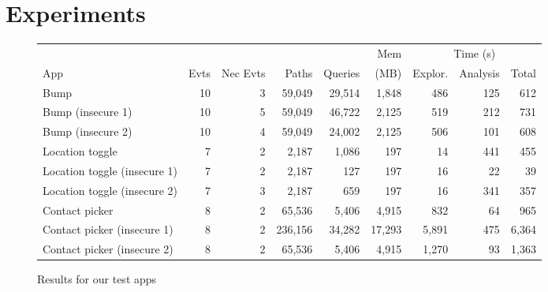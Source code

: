 \documentclass{entcs} \usepackage{entcsmacro}
\newcommand{\comment}[3][\color{red}]{{#1{[{#2}: {#3}]}}}
\newcommand{\kris}[1]{\comment[\color{orange}]{kris}{#1}}
\begin{document}

\section{Experiments}
\label{sec:experiments}

\begin{figure*}
\small
\centering
\begin{tabular}{ | l | r | r || r | r | r | r | r | r |}
  \hline
  &&&&& Mem &\multicolumn{3}{c|}{Time (s)} \\ \cline{6-8}
  App & Evts & Nec Evts & Paths & Queries &
  (MB) & Explor. & Analysis & Total \\
  \hline
  Bump & 10 & 3 & 59,049 & 29,514 & 1,848 & 486 & 125 & 612 \\
  Bump (insecure 1) & 10 & 5 & 59,049 & 46,722 & 2,125 & 519 & 212 & 731 \\
  Bump (insecure 2) & 10 & 4 & 59,049 & 24,002 & 2,125 & 506 & 101 & 608 \\
  Location toggle & 7 & 2 & 2,187 & 1,086 & 197 & 14 & 441 & 455 \\
  Location toggle (insecure 1) & 7 & 2  & 2,187 & 127 & 197 & 16 & 22 & 39 \\
  Location toggle (insecure 2) & 7 & 3 & 2,187 & 659 & 197 & 16 & 341 & 357 \\
  Contact picker & 8 & 2 & 65,536 & 5,406 & 4,915 & 832 & 64 & 965 \\
  Contact picker (insecure 1) & 8 & 2 & 236,156 & 34,282 & 17,293 & 5,891 & 475 & 6,364  \\
  Contact picker (insecure 2) & 8 & 2 & 65,536 & 5,406 & 4,915 & 1,270 & 93 & 1,363 \\
  \hline
\end{tabular}
\caption{Results for our test apps}
\label{fig:results}
\end{figure*}
\end{document}
